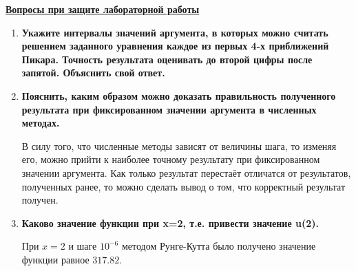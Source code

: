\underline{\textbf{Вопросы при защите лабораторной работы}}\\

\begin{enumerate}
\item \textbf{Укажите интервалы значений аргумента, в которых можно считать решением заданного уравнения каждое из первых 4-х приближений Пикара. Точность результата оценивать до второй цифры после запятой. Объяснить свой ответ.}

\item \textbf{Пояснить, каким образом можно доказать правильность полученного результата при фиксированном значении аргумента в численных методах.}

В силу того, что численные методы зависят от величины шага, то изменяя его, можно прийти к наиболее точному результату при фиксированном значении аргумента. Как только результат перестаёт отличатся от результатов, полученных ранее, то можно сделать вывод о том, что корректный результат получен.

\item \textbf{Каково значение функции при x=2, т.е. привести значение u(2).}

При $x = 2$ и шаге $10^{-6}$ методом Рунге-Кутта было получено значение функции равное $317.82$.
\end{enumerate}